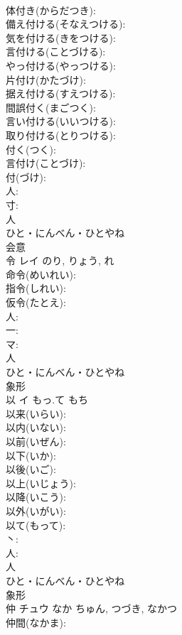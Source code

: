 \documentclass[8pt]{extreport}
\begin{document}
\begin{CJK}{UTF8}{min}
\\	体付き(からだつき): 
\\	備え付ける(そなえつける): 
\\	気を付ける(きをつける): 
\\	言付ける(ことづける): 
\\	やっ付ける(やっつける): 
\\	片付け(かたづけ): 
\\	据え付ける(すえつける): 
\\	間誤付く(まごつく): 
\\	言い付ける(いいつける): 
\\	取り付ける(とりつける): 
\\	付く(つく): 
\\	言付け(ことづけ): 
\\	付(づけ): 
\\	人: 
\\	寸: 
\\	人	
\\	ひと・にんべん・ひとやね	
\\	会意 
\\	令	レイ		のり, りょう, れ	
\\	命令(めいれい): 
\\	指令(しれい): 
\\	仮令(たとえ): 
\\	人: 
\\	一: 
\\	マ: 
\\	人	
\\	ひと・にんべん・ひとやね	
\\	象形 
\\	以	イ	もっ.て	もち	
\\	以来(いらい): 
\\	以内(いない): 
\\	以前(いぜん): 
\\	以下(いか): 
\\	以後(いご): 
\\	以上(いじょう): 
\\	以降(いこう): 
\\	以外(いがい): 
\\	以て(もって): 
\\	丶: 
\\	人: 
\\	人	
\\	ひと・にんべん・ひとやね	
\\	象形 
\\	仲	チュウ	なか	ちゅん, つづき, なかつ	
\\	仲間(なかま): 

\end{CJK}
\end{document}
